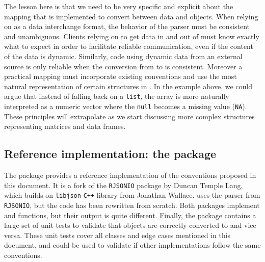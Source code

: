 The lesson here is that we need to be very specific and explicit about the mapping that is implemented to convert between \JSON data and \R objects. When relying on \JSON as a data interchange format, the behavior of the parser must be consistent and unambiguous. Clients relying on \JSON to get data in and out of \R must know exactly what to expect in order to facilitate reliable communication, even if the content of the data is dynamic. Similarly, \R code using dynamic \JSON data from an external source is only reliable when the conversion from \JSON to \R is consistent. Moreover a practical mapping must incorporate existing conventions and use the most natural representation of certain structures in \R.  In the example above, we could argue that instead of falling back on a \texttt{list}, the array is more naturally interpreted as a numeric vector where the \texttt{null} becomes a missing value (\texttt{NA}). These principles will extrapolate as we start discussing more complex \JSON structures representing matrices and data frames.

% 

\subsection{Reference implementation: the \jsonlite package}

The \jsonlite package provides a reference implementation of the conventions proposed in this document. It is a fork of the \texttt{RJSONIO} package by Duncan Temple Lang, which builds on \texttt{libjson} \texttt{C++} library from Jonathan Wallace. \jsonlite uses the parser from \texttt{RJSONIO}, but the \R code has been rewritten from scratch. Both packages implement \toJSON and \fromJSON functions, but their output is quite different. Finally, the \jsonlite package contains a large set of unit tests to validate that \R objects are correctly converted to \JSON and vice versa. These unit tests cover all classes and edge cases mentioned in this document, and could be used to validate if other implementations follow the same conventions. 

